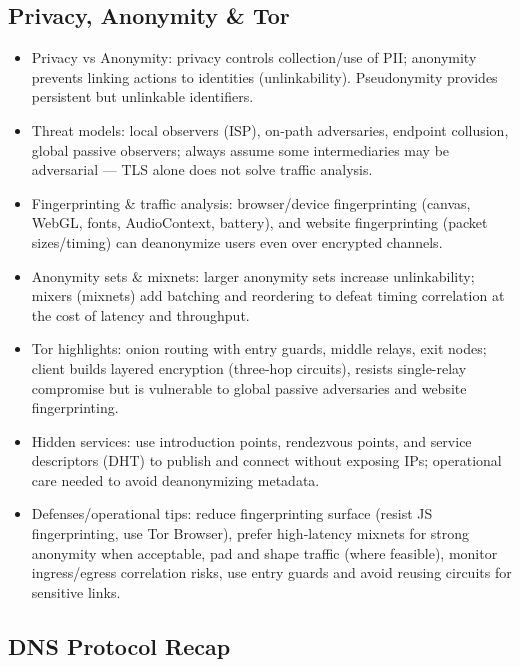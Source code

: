\documentclass{article}
\begin{document}
\subsection{Privacy, Anonymity \& Tor}
\begin{itemize}
  \item Privacy vs Anonymity: privacy controls collection/use of PII; anonymity prevents linking actions to identities (unlinkability). Pseudonymity provides persistent but unlinkable identifiers.
  \item Threat models: local observers (ISP), on‑path adversaries, endpoint collusion, global passive observers; always assume some intermediaries may be adversarial — TLS alone does not solve traffic analysis.
  \item Fingerprinting \& traffic analysis: browser/device fingerprinting (canvas, WebGL, fonts, AudioContext, battery), and website fingerprinting (packet sizes/timing) can deanonymize users even over encrypted channels.
  \item Anonymity sets \& mixnets: larger anonymity sets increase unlinkability; mixers (mixnets) add batching and reordering to defeat timing correlation at the cost of latency and throughput.
  \item Tor highlights: onion routing with entry guards, middle relays, exit nodes; client builds layered encryption (three-hop circuits), resists single-relay compromise but is vulnerable to global passive adversaries and website fingerprinting.
  \item Hidden services: use introduction points, rendezvous points, and service descriptors (DHT) to publish and connect without exposing IPs; operational care needed to avoid deanonymizing metadata.
  \item Defenses/operational tips: reduce fingerprinting surface (resist JS fingerprinting, use Tor Browser), prefer high‑latency mixnets for strong anonymity when acceptable, pad and shape traffic (where feasible), monitor ingress/egress correlation risks, use entry guards and avoid reusing circuits for sensitive links.
\end{itemize}

\subsection{DNS Protocol Recap}
\end{document}
